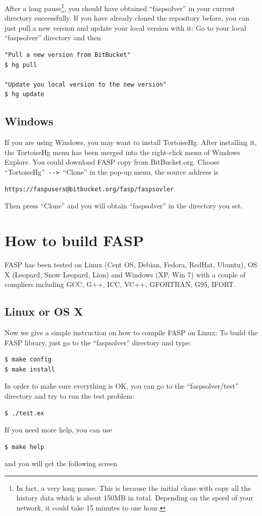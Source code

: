 \documentclass[11pt]{memoir}
\begin{document}
After a long pause\footnote{In fact, a very long pause. This is because the initial clone with copy all the history data which is about 150MB in total. Depending on the speed of your network, it could take 15 minutes to one hour.}, you should have obtained ``faspsolver'' in your current directory successfully. If you have already cloned the repository before, you can just pull a new version and update your local version with it: Go to your local ``faspsolver'' directory and then
%
\begin{lstlisting}[numbers=none]
"Pull a new version from BitBucket"
$ hg pull

"Update you local version to the new version"
$ hg update
\end{lstlisting}
%

\subsection{Windows}
If you are using Windows, you may want to install TortoiseHg. After installing it, the TortoiseHg menu has been merged into the right-click menu of Windows Explore. You could download FASP copy from BitBucket.org. Choose ``TortoiseHg''\verb| --> |``Clone'' in the pop-up menu, the source address is
\begin{lstlisting}[numbers=none]
https://faspusers@bitbucket.org/fasp/faspsovler
\end{lstlisting}
Then press ``Clone'' and you will obtain ``faspsolver'' in the directory you set.


\section{How to build FASP}\label{sec:build}

FASP has been tested on Linux (Cent OS, Debian, Fedora, RedHat, Ubuntu), OS X (Leopard, Snow Leopard, Lion) and Windows (XP, Win 7) with a couple of compliers including GCC, G++, ICC, VC++, GFORTRAN, G95, IFORT.

\subsection{Linux or OS X}

Now we give a simple instruction on how to compile FASP on Linux: To build the FASP library, just go to the ``faspsolver'' directory and type:
%
\begin{lstlisting}[numbers=none]
$ make config
$ make install
\end{lstlisting}
%
In order to make sure everything is OK, you can go to the ``faspsolver/test'' directory and try to run the test problem:
%
\begin{lstlisting}[numbers=none]
$ ./test.ex
\end{lstlisting}
%
If you need more help, you can use
%
\begin{lstlisting}[numbers=none]
$ make help
\end{lstlisting}
%
and you will get the following screen

\end{document}
